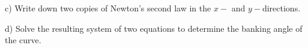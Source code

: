 \documentclass[12pt]{article}
\begin{document}
\begin{minipage}{0.5\textwidth}
c) Write down two copies of Newton's second law in the $x-$ and $y-$directions.
\end{minipage}
\begin{minipage}{0.5\textwidth}
d) Solve the resulting system of two equations to determine the banking angle of the curve.
\end{minipage}
\end{document}
